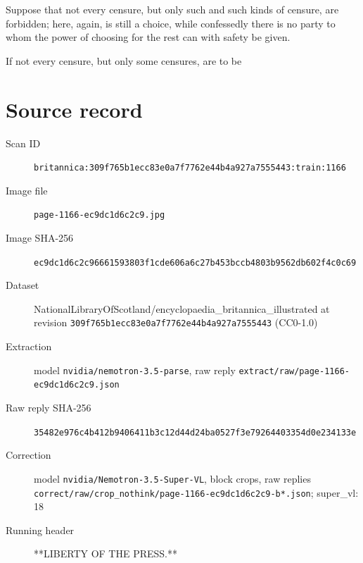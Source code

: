 \documentclass{article}
\begin{document}
Suppose that not every censure, but only such and such kinds of censure, are forbidden; here, again, is still a choice, while confessedly there is no party to whom the power of choosing for the rest can with safety be given.

If not every censure, but only some censures, are to be


\section*{Source record}
\begin{description}
\item[Scan ID] \texttt{britannica:309f765b1ecc83e0a7f7762e44b4a927a7555443:train:1166}
\item[Image file] \texttt{page-1166-ec9dc1d6c2c9.jpg}
\item[Image SHA-256] \texttt{ec9dc1d6c2c96661593803f1cde606a6c27b453bccb4803b9562db602f4c0c69}
\item[Dataset] NationalLibraryOfScotland/encyclopaedia\_britannica\_illustrated at revision \texttt{309f765b1ecc83e0a7f7762e44b4a927a7555443} (CC0-1.0)
\item[Extraction] model \texttt{nvidia/nemotron-3.5-parse}, raw reply \texttt{extract/raw/page-1166-ec9dc1d6c2c9.json}
\item[Raw reply SHA-256] \texttt{35482e976c4b412b9406411b3c12d44d24ba0527f3e79264403354d0e234133e}
\item[Correction] model \texttt{nvidia/Nemotron-3.5-Super-VL}, block crops, raw replies \texttt{correct/raw/crop\_nothink/page-1166-ec9dc1d6c2c9-b*.json}; super\_vl: 18
\item[Running header] **LIBERTY OF THE PRESS.**
\end{description}
\end{document}

